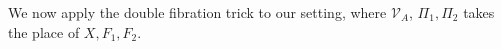 \documentclass[10pt]{amsart}
\numberwithin{equation}{section}     %
\newcommand{\V}{\mathcal{V}}
\newcommand{\cV}{\mathcal{V}}\newcommand{\cW}{\mathcal{W}}\newcommand{\cX}{\mathcal{X}}
\newcommand{\FF}{\mathbb{F}}
\newcommand{\U}{\mathrm{U}}
\begin{document}


We now apply the double fibration trick to our setting, where $\cV_A$, $\Pi_1,\Pi_2$ takes the place of $X, F_1,F_2$.



\end{document}
